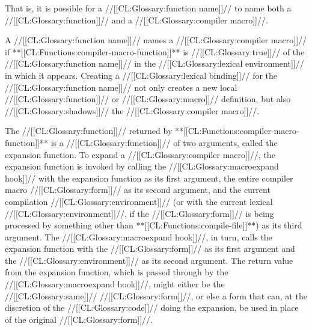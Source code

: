 That is, it is possible for a //[[CL:Glossary:function name]]// to name both a //[[CL:Glossary:function]]// and a //[[CL:Glossary:compiler macro]]//.

A //[[CL:Glossary:function name]]// names a //[[CL:Glossary:compiler macro]]// if **[[CL:Functions:compiler-macro-function]]** is //[[CL:Glossary:true]]// of the //[[CL:Glossary:function name]]// in the //[[CL:Glossary:lexical environment]]// in which it appears.  Creating a //[[CL:Glossary:lexical binding]]// for the //[[CL:Glossary:function name]]// not only creates a new local //[[CL:Glossary:function]]// or //[[CL:Glossary:macro]]// definition, but also //[[CL:Glossary:shadows]]// the //[[CL:Glossary:compiler macro]]//.

The //[[CL:Glossary:function]]// returned by **[[CL:Functions:compiler-macro-function]]** is a //[[CL:Glossary:function]]// of two arguments, called the expansion function.  To expand a //[[CL:Glossary:compiler macro]]//, the expansion function is invoked by calling the //[[CL:Glossary:macroexpand hook]]// with
      the expansion function as its first argument,
      the entire compiler macro //[[CL:Glossary:form]]// as its second argument,
  and the current compilation //[[CL:Glossary:environment]]// 
       (or with the current lexical //[[CL:Glossary:environment]]//,
 	 if the //[[CL:Glossary:form]]// is being processed by something 	 other than **[[CL:Functions:compile-file]]**) 
       as its third argument. The //[[CL:Glossary:macroexpand hook]]//, in turn, calls the expansion function with the //[[CL:Glossary:form]]// as its first argument and the //[[CL:Glossary:environment]]// as its second argument. The return value from the expansion function, which is passed through by the //[[CL:Glossary:macroexpand hook]]//, might either be the //[[CL:Glossary:same]]// //[[CL:Glossary:form]]//,  or else a form that can, at the discretion of the //[[CL:Glossary:code]]// doing the expansion,  be used in place of the original //[[CL:Glossary:form]]//.



